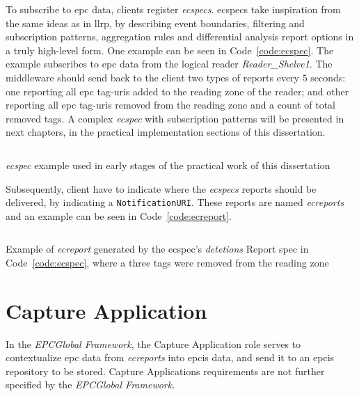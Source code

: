 To subscribe to \ac{epc} data, clients register \emph{\acp{ecspec}}. 
\acp{ecspec} take inspiration from the same ideas as in \ac{llrp}, by describing event boundaries, filtering and subscription patterns, aggregation rules and differential analysis report options in a truly high-level form.
One example can be seen in Code~\ref{code:ecspec}. The example subscribes to \ac{epc} data from the logical reader \textit{Reader\_Shelve1}. The middleware should send back to the client two types of reports every $5$ seconds: one reporting all \ac{epc} tag-\acp{uri} added to the reading zone of the reader; and other reporting all \ac{epc} tag-\acp{uri} removed from the reading zone and a count of total removed tags.
A complex \emph{\ac{ecspec}} with subscription patterns will be presented in next chapters, in the practical implementation sections of this dissertation.

\begin{listing}
    \inputminted[linenos, breaklines]{xml}{./code/sota/ECSpec.xml}
    \caption[\emph{\ac{ecspec}} example]{\emph{\ac{ecspec}} example used in early stages of the practical work of this dissertation}
    \label{code:ecspec}
\end{listing}

Subsequently, client have to indicate where the \emph{\acp{ecspec}} reports should be delivered, by indicating a \texttt{NotificationURI}.
These reports are named \emph{\acp{ecreport}} and an example can be seen in Code~\ref{code:ecreport}.

\begin{listing}
    \inputminted[linenos, breaklines]{xml}{./code/sota/EC_REPORT_deletions.xml}
    \caption[Example of \emph{\ac{ecreport}}]{Example of \emph{\ac{ecreport}} generated by the \ac{ecspec}'s \textit{detetions} Report \ac{spec} in Code~\ref{code:ecspec}, where a three tags were removed from the reading zone}
    \label{code:ecreport}
\end{listing}

\section{Capture Application}

In the \emph{EPCGlobal Framework}, the Capture Application role serves to contextualize \ac{epc} data from \emph{\acp{ecreport}} into \ac{epcis} data, and send it to an \ac{epcis} repository to be stored.
Capture Applications requirements are not further specified by the \emph{EPCGlobal Framework}.


